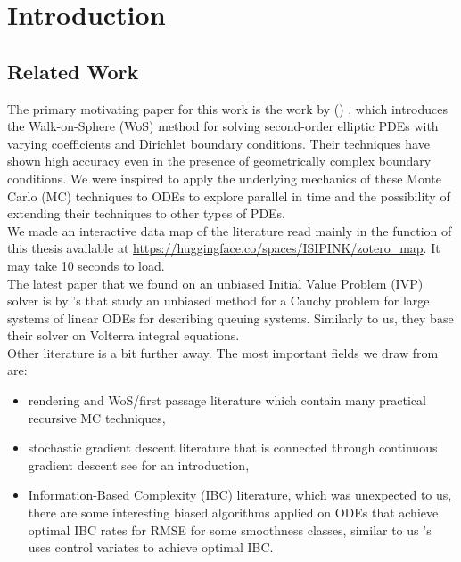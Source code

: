 \documentclass[a4paper,12pt]{article}
\begin{document}


\newpage
\tableofcontents
\newpage

\begin{abstract}
    
\end{abstract}


\section{Introduction}

\subsection{Related Work}
The primary motivating paper for this work is the work
by \citeauthor{sawhney_grid-free_2022}
(\citeyear{sawhney_grid-free_2022}) \cite{sawhney_grid-free_2022},
which introduces the Walk-on-Sphere (WoS) method for solving second-order
elliptic PDEs with varying coefficients and Dirichlet boundary conditions.
Their techniques have shown high accuracy even in the presence of geometrically
complex boundary conditions. We were inspired to apply the underlying
mechanics of these Monte Carlo (MC) techniques to ODEs to explore
parallel in time and the possibility of extending their techniques
to other types of PDEs. \\

We made an interactive data map of the literature read
mainly in the function of this thesis available at
\url{https://huggingface.co/spaces/ISIPINK/zotero_map}.
It may take 10 seconds to load. \\

The latest paper that we found on an unbiased Initial Value Problem (IVP) solver is by
\citeauthor{ermakov_monte_2021}'s \citeyear{ermakov_monte_2021}
\cite{ermakov_monte_2021}  that study an unbiased method for
a Cauchy problem for large systems of linear ODEs
for describing queuing systems. Similarly to us, they
base their solver on Volterra integral equations.\\

Other literature is a bit further away.
The most important fields we draw from are:

\begin{itemize}
    \item rendering and WoS/first passage literature
          which contain many practical recursive
          MC techniques,

    \item  stochastic gradient descent literature
          that is connected through continuous gradient descent
          see \cite{huang_hybrid_2017} for an introduction,

    \item  Information-Based Complexity (IBC) literature, which was
          unexpected to us, there are some interesting
          biased algorithms applied on ODEs that achieve optimal
          IBC rates for RMSE for some smoothness classes, similar to us
          \citeauthor{daun_randomized_2011}'s \citeyear{daun_randomized_2011}
          \cite{daun_randomized_2011} uses control variates
          to achieve optimal IBC.
\end{itemize}
\end{document}
